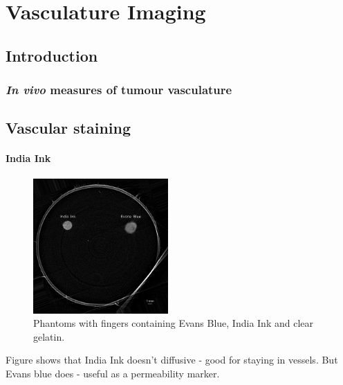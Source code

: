 \chapter{Vasculature Imaging}

\section{Introduction}

\subsection{\textit{In vivo} measures of tumour vasculature}

\section{Vascular staining}

\subsubsection{India Ink}

\begin{figure}
	\centering
	\includegraphics[width = 0.46\textwidth]{meth_img/3_EB_Ink_2mm_slice400_btscled.png}
	\caption{Phantoms with fingers containing Evans Blue, India Ink and clear gelatin.}
	\label{subfig:phant5}
\end{figure}





Figure shows that India Ink doesn't diffusive - good for staying in vessels. But Evans blue does - useful as a permeability marker.